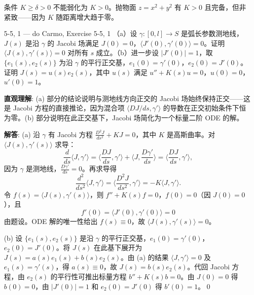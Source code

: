 \begin{Remark}
条件 $K \geq \delta > 0$ 不能弱化为 $K>0$。抛物面 $z=x^2+y^2$ 有 $K>0$ 且完备，但非紧致——因为 $K$ 随距离增大趋于零。
\end{Remark}

\begin{exercise}{5-5, 1 — do Carmo, Exercise 5-5, 1}
（a）设 $\gamma: [0,l] \to S$ 是弧长参数测地线，$J(s)$ 是沿 $\gamma$ 的 Jacobi 场满足 $J(0)=0$，$\langle J'(0),\gamma'(0)\rangle = 0$。证明 $\langle J(s),\gamma'(s)\rangle = 0$ 对所有 $s$ 成立。（b）进一步设 $|J'(0)|=1$，取 $\{e_1(s),e_2(s)\}$ 为沿 $\gamma$ 的平行正交基，$e_1(0)=\gamma'(0)$，$e_2(0)=J'(0)$。证明 $J(s)=u(s)e_2(s)$，其中 $u(s)$ 满足 $u''+K(s)u=0$，$u(0)=0$，$u'(0)=1$。
\end{exercise}
\begin{solution}
\textbf{直观理解}: (a) 部分的结论说明与测地线方向正交的 Jacobi 场始终保持正交——这是 Jacobi 方程的直接推论，因为混合项 $\langle DJ/ds, \gamma'\rangle$ 的导数在正交初始条件下恒为零。(b) 部分说明在此正交基下，Jacobi 场简化为一个标量二阶 ODE 的解。

\textbf{解答}: (a) 沿 $\gamma$ 有 Jacobi 方程 $\frac{D^2J}{ds^2}+KJ=0$，其中 $K$ 是高斯曲率。对 $\langle J(s),\gamma'(s)\rangle$ 求导：
\[
\frac{d}{ds}\langle J,\gamma'\rangle = \langle \frac{DJ}{ds},\gamma'\rangle + \langle J,\frac{D\gamma'}{ds}\rangle = \langle \frac{DJ}{ds},\gamma'\rangle,
\]
因为 $\gamma$ 是测地线，$\frac{D\gamma'}{ds}=0$。再求导得
\[
\frac{d^2}{ds^2}\langle J,\gamma'\rangle = \langle \frac{D^2J}{ds^2},\gamma'\rangle = -K\langle J,\gamma'\rangle.
\]
令 $f(s)=\langle J(s),\gamma'(s)\rangle$，则 $f''+K(s)f=0$，$f(0)=0$（因 $J(0)=0$），且
\[
f'(0)=\langle J'(0),\gamma'(0)\rangle = 0
\]
由题设。ODE 解的唯一性给出 $f(s)\equiv 0$，故 $\langle J(s),\gamma'(s)\rangle=0$。

(b) 设 $\{e_1(s),e_2(s)\}$ 是沿 $\gamma$ 的平行正交基，$e_1(0)=\gamma'(0)$，$e_2(0)=J'(0)$。将 $J(s)$ 在此基下展开为 $J(s)=a(s)e_1(s)+b(s)e_2(s)$。由 (a) 的结果 $\langle J,\gamma'\rangle=0$ 及 $e_1(s)=\gamma'(s)$，得 $a(s)\equiv 0$，故 $J(s)=b(s)e_2(s)$。代回 Jacobi 方程，由 $e_2(s)$ 的平行性可推出标量方程 $b''+K(s)b=0$。由 $J(0)=0$ 得 $b(0)=0$，由 $|J'(0)|=1$ 和 $e_2(0)=J'(0)$ 得 $b'(0)=1$。\qed
\end{solution}

